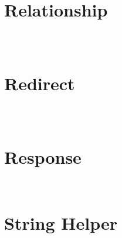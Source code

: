 \chapter{Relationship}

\begin{lstlisting}[language=PHP]

\end{lstlisting}




\begin{lstlisting}[language=PHP]

\end{lstlisting}



\begin{lstlisting}[language=PHP]

\end{lstlisting}

\chapter{Redirect}


\begin{lstlisting}[language=PHP]

\end{lstlisting}



\begin{lstlisting}[language=PHP]

\end{lstlisting}



\begin{lstlisting}[language=PHP]

\end{lstlisting}

\chapter{Response}

\begin{lstlisting}[language=PHP]

\end{lstlisting}




\begin{lstlisting}[language=PHP]

\end{lstlisting}


\chapter{String Helper}

